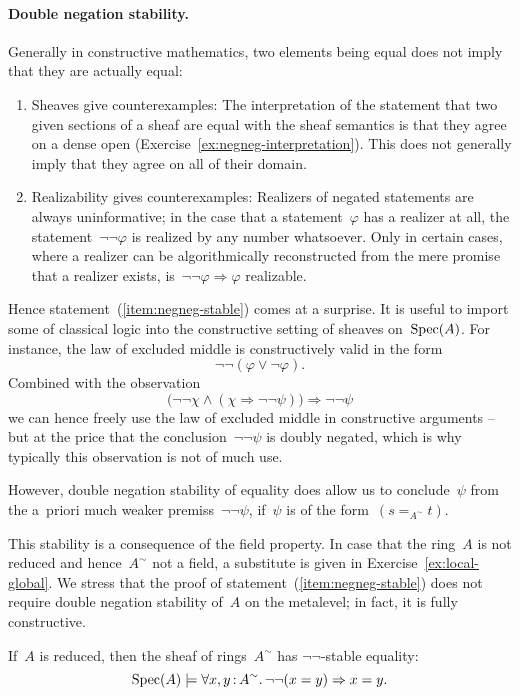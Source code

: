 \documentclass{ws-rv9x6}
\begin{document}
{\paragraph{Double negation stability.}\label{par:double-negation-stability}
Generally in constructive mathematics,
two elements being \notnot equal does not imply that they are actually equal:
\begin{enumerate}
\item Sheaves give counterexamples: The interpretation of the statement that
two given sections of a sheaf are \notnot equal with the sheaf semantics is
that they agree on a dense open (Exercise~\ref{ex:negneg-interpretation}). This
does not generally imply that they agree on all of their domain.
\item Realizability gives counterexamples: Realizers of negated statements are
always uninformative; in the case that a statement~$\varphi$ has a realizer at
all, the statement~$\neg\neg\varphi$ is realized by any number whatsoever.
Only in certain cases, where a realizer can be algorithmically reconstructed
from the mere promise that a realizer exists, is~$\neg\neg\varphi \Rightarrow
\varphi$ realizable.
\end{enumerate}

Hence statement~(\ref{item:negneg-stable}) comes at a surprise. It is useful to
import some of classical logic into the constructive setting of sheaves
on~$\mathrm{Spec}(A)$. For instance, the law of excluded middle is constructively valid
in the form
\[ \neg\neg(\varphi \vee \neg\varphi). \]
Combined with the observation
\[ \bigl(\neg\neg\chi \wedge (\chi \Rightarrow \neg\neg\psi)\bigr) \Longrightarrow \neg\neg\psi \]
we can hence freely use the law of excluded middle in constructive arguments --
but at the price that the conclusion~$\neg\neg\psi$ is doubly negated, which is
why typically this observation is not of much use.

However, double negation stability of equality does allow us to conclude~$\psi$
from the a~priori much weaker premiss~$\neg\neg\psi$, if~$\psi$ is of the
form~$(s =_{A^\sim} t)$.

This stability is a consequence of the field property. In case that the
ring~$A$ is not reduced and hence~$A^\sim$ not a field, a substitute is given
in Exercise~\ref{ex:local-global}. We stress that the proof of
statement~(\ref{item:negneg-stable}) does not require double negation stability
of~$A$ on the metalevel; in fact, it is fully constructive.

\begin{proposition}If~$A$ is reduced, then the sheaf of rings~$A^\sim$ has $\neg\neg$-stable equality:
\[ \mathrm{Spec}(A) \models \forall x,y\,{:}\,A^\sim\mathpunct{.} \neg\neg(x = y) \Rightarrow x = y. \]
\end{proposition}

}
\end{document}
